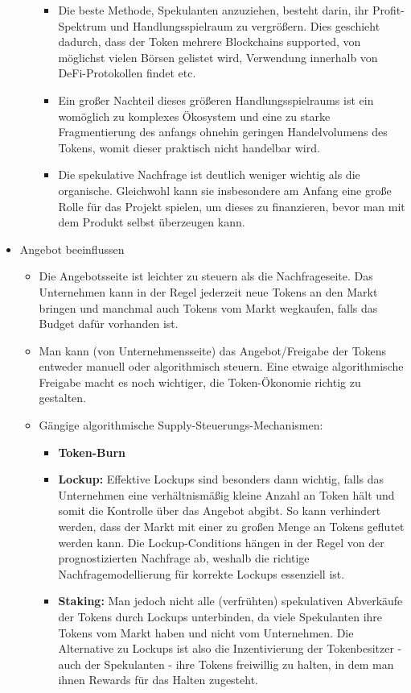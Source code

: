 \begin{Zitat*}
\begin{itemize}
\begin{itemize}
\begin{itemize}
		\item Die beste Methode, Spekulanten anzuziehen, besteht darin, ihr Profit-Spektrum und Handlungsspielraum zu vergrößern. Dies geschieht dadurch, dass der Token mehrere Blockchains supported, von möglichst vielen Börsen gelistet wird, Verwendung innerhalb von DeFi-Protokollen findet etc.
		\item Ein großer Nachteil dieses größeren Handlungsspielraums ist ein womöglich zu komplexes Ökosystem und eine zu starke Fragmentierung des anfangs ohnehin geringen Handelvolumens des Tokens, womit dieser praktisch nicht handelbar wird.
		\item Die spekulative Nachfrage ist deutlich weniger wichtig als die organische. Gleichwohl kann sie insbesondere am Anfang eine große Rolle für das Projekt spielen, um dieses zu finanzieren, bevor man mit dem Produkt selbst überzeugen kann.
	\end{itemize}
  \end{itemize}
  \item Angebot beeinflussen
  \begin{itemize}
  	\item Die Angebotsseite ist leichter zu steuern als die Nachfrageseite. Das Unternehmen kann in der Regel jederzeit neue Tokens an den Markt bringen und manchmal auch Tokens vom Markt wegkaufen, falls das Budget dafür vorhanden ist.
  	\item Man kann (von Unternehmensseite) das Angebot/Freigabe der Tokens entweder manuell oder algorithmisch steuern. Eine etwaige algorithmische Freigabe macht es noch wichtiger, die Token-Ökonomie richtig zu gestalten. 
	\item Gängige algorithmische Supply-Steuerungs-Mechanismen:
	\begin{itemize}
		\item \textbf{Token-Burn}
		\item \textbf{Lockup:} Effektive Lockups sind besonders dann wichtig, falls das Unternehmen eine verhältnismäßig kleine Anzahl an Token hält und somit die Kontrolle über das Angebot abgibt. So kann verhindert werden, dass der Markt mit einer zu großen Menge an Tokens geflutet werden kann. Die Lockup-Conditions hängen in der Regel von der prognostizierten Nachfrage ab, weshalb die richtige Nachfragemodellierung für korrekte Lockups essenziell ist.
		\item \textbf{Staking:} Man jedoch nicht alle (verfrühten) spekulativen Abverkäufe der Tokens durch Lockups unterbinden, da viele Spekulanten ihre Tokens vom Markt haben und nicht vom Unternehmen. Die Alternative zu Lockups ist also die Inzentivierung der Tokenbesitzer - auch der Spekulanten - ihre Tokens freiwillig zu halten, in dem man ihnen Rewards für das Halten zugesteht.
	\end{itemize}
  \end{itemize}
\end{itemize}


\end{Zitat*}
